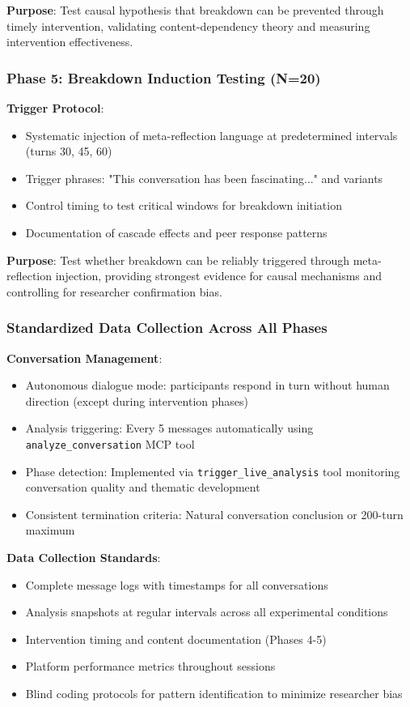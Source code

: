 \documentclass[11pt,letterpaper]{article}
\begin{document}
\textbf{Purpose}: Test causal hypothesis that breakdown can be prevented through timely intervention, validating content-dependency theory and measuring intervention effectiveness.

\subsubsection{Phase 5: Breakdown Induction Testing (N=20)}

\textbf{Trigger Protocol}:
\begin{itemize}
    \item Systematic injection of meta-reflection language at predetermined intervals (turns 30, 45, 60)
    \item Trigger phrases: "This conversation has been fascinating..." and variants
    \item Control timing to test critical windows for breakdown initiation
    \item Documentation of cascade effects and peer response patterns
\end{itemize}

\textbf{Purpose}: Test whether breakdown can be reliably triggered through meta-reflection injection, providing strongest evidence for causal mechanisms and controlling for researcher confirmation bias.

\subsubsection{Standardized Data Collection Across All Phases}

\textbf{Conversation Management}:
\begin{itemize}
    \item Autonomous dialogue mode: participants respond in turn without human direction (except during intervention phases)
    \item Analysis triggering: Every 5 messages automatically using \texttt{analyze\_conversation} MCP tool
    \item Phase detection: Implemented via \texttt{trigger\_live\_analysis} tool monitoring conversation quality and thematic development
    \item Consistent termination criteria: Natural conversation conclusion or 200-turn maximum
\end{itemize}

\textbf{Data Collection Standards}:
\begin{itemize}
    \item Complete message logs with timestamps for all conversations
    \item Analysis snapshots at regular intervals across all experimental conditions
    \item Intervention timing and content documentation (Phases 4-5)
    \item Platform performance metrics throughout sessions
    \item Blind coding protocols for pattern identification to minimize researcher bias
\end{itemize}
\end{document}
